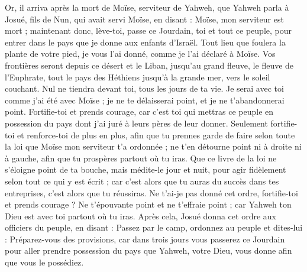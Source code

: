 \begin{multicols}{2}
\VerseOne{}Or, il arriva après la mort de Moïse, serviteur de Yahweh, que Yahweh parla à Josué, fils de Nun, qui avait servi Moïse, en disant :
Moïse, mon serviteur est mort ; maintenant donc, lève-toi, passe ce Jourdain, toi et tout ce peuple, pour entrer dans le pays que je donne aux enfants d'Israël.
Tout lieu que foulera la plante de votre pied, je vous l'ai donné, comme je l'ai déclaré à Moïse.
Vos frontières seront depuis ce désert et le Liban, jusqu'au grand fleuve, le fleuve de l'Euphrate, tout le pays des Héthiens jusqu'à la grande mer, vers le soleil couchant.
Nul ne tiendra devant toi, tous les jours de ta vie. Je serai avec toi comme j'ai été avec Moïse ; je ne te délaisserai point, et je ne t'abandonnerai point.
Fortifie-toi et prends courage, car c'est toi qui mettras ce peuple en possession du pays dont j'ai juré à leurs pères de leur donner.
Seulement fortifie-toi et renforce-toi de plus en plus, afin que tu prennes garde de faire selon toute la loi que Moïse mon serviteur t'a ordonnée ; ne t'en détourne point ni à droite ni à gauche, afin que tu prospères partout où tu iras.
Que ce livre de la loi ne s'éloigne point de ta bouche, mais médite-le jour et nuit, pour agir fidèlement selon tout ce qui y est écrit ; car c'est alors que tu auras du succès dans tes entreprises, c'est alors que tu réussiras.
Ne t'ai-je pas donné cet ordre, fortifie-toi et prends courage ? Ne t'épouvante point et ne t'effraie point ; car Yahweh ton Dieu est avec toi partout où tu iras.
Après cela, Josué donna cet ordre aux officiers du peuple, en disant :
Passez par le camp, ordonnez au peuple et dites-lui : Préparez-vous des provisions, car dans trois jours vous passerez ce Jourdain pour aller prendre possession du pays que Yahweh, votre Dieu, vous donne afin que vous le possédiez.

\end{multicols}

